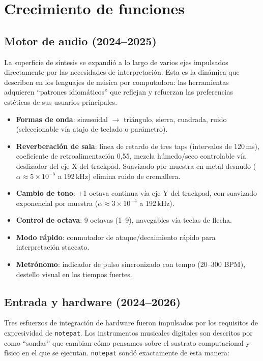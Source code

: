 \documentclass[10pt,letterpaper,twocolumn]{article}
\begin{document}
\section{Crecimiento de funciones}

\subsection{Motor de audio (2024--2025)}

La superficie de síntesis se expandió a lo largo de varios ejes impulsados directamente por las necesidades de interpretación. Esta es la dinámica que \citet{mcpherson2020idiomatic} describen en los lenguajes de música por computadora: las herramientas adquieren ``patrones idiomáticos'' que reflejan y refuerzan las preferencias estéticas de sus usuarios principales.

\begin{itemize}
  \item \textbf{Formas de onda}: sinusoidal $\rightarrow$ triángulo, sierra, cuadrada, ruido (seleccionable vía atajo de teclado o parámetro).
  \item \textbf{Reverberación de sala}: línea de retardo de tres taps (intervalos de 120\,ms), coeficiente de retroalimentación 0,55, mezcla húmedo/seco controlable vía deslizador del eje X del trackpad. Suavizado por muestra en metal desnudo ($\alpha \approx 5 \times 10^{-5}$ a 192\,kHz) elimina ruido de cremallera.
  \item \textbf{Cambio de tono}: $\pm$1 octava continua vía eje Y del trackpad, con suavizado exponencial por muestra ($\alpha \approx 3 \times 10^{-4}$ a 192\,kHz).
  \item \textbf{Control de octava}: 9 octavas (1--9), navegables vía teclas de flecha.
  \item \textbf{Modo rápido}: conmutador de ataque/decaimiento rápido para interpretación staccato.
  \item \textbf{Metrónomo}: indicador de pulso sincronizado con tempo (20--300 BPM), destello visual en los tiempos fuertes.
\end{itemize}

\subsection{Entrada y hardware (2024--2026)}

Tres esfuerzos de integración de hardware fueron impulsados por los requisitos de expresividad de \texttt{notepat}. Los instrumentos musicales digitales son descritos por \citet{tahiroglu2020probes} como ``sondas'' que cambian cómo pensamos sobre el sustrato computacional y físico en el que se ejecutan. \texttt{notepat} sondó exactamente de esta manera:
\end{document}
